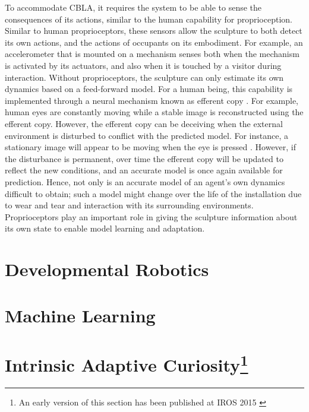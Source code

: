 To accommodate CBLA, it requires the system to be able to sense the consequences of its actions, similar to the human capability for proprioception. Similar to human proprioceptors, these sensors allow the sculpture to both detect its own actions, and the actions of occupants on its embodiment. For example, an accelerometer that is mounted on a mechanism senses both when the mechanism is activated by its actuators, and also when it is touched by a visitor during interaction. Without proprioceptors, the sculpture can only estimate its own dynamics based on a feed-forward model. For a human being, this capability is implemented through a neural mechanism known as efferent copy \cite{Bridgeman2007}. For example, human eyes are constantly moving while a stable image is reconstructed using the efferent copy. However, the efferent copy can be deceiving when the external environment is disturbed to conflict with the predicted model. For instance, a stationary image will appear to be moving when the eye is pressed \cite{Bridgeman2007}. However, if the disturbance is permanent, over time the efferent copy will be updated to reflect the new conditions, and an accurate model is once again available for prediction. Hence, not only is an accurate model of an agent's own dynamics difficult to obtain; such a model might change over the life of the installation due to wear and tear and interaction with its surrounding environments. Proprioceptors play an important role in giving the sculpture information about its own state to enable model learning and adaptation.

\section{Developmental Robotics}

\section{Machine Learning}


\section[Intrinsic Adaptive Curiosity] {Intrinsic Adaptive Curiosity\footnote{An early version of this section has been published at IROS 2015 \cite{Chan2015} }}

